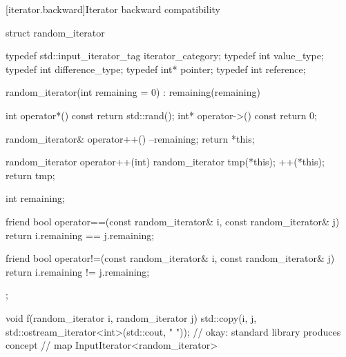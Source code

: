 \documentclass[american,twoside]{book}
\begin{document}
\pnum 
{}

\color{addclr}
[iterator.backward]{Iterator backward compatibility}

\pnum
{}
\begin{codeblock}
struct random_iterator
{
  typedef std::input_iterator_tag iterator_category;
  typedef int                     value_type;
  typedef int                     difference_type;
  typedef int*                    pointer;
  typedef int                     reference;

  random_iterator(int remaining = 0) : remaining(remaining) { }

  int operator*() const { return std::rand(); }
  int* operator->() const { return 0; }
  
  random_iterator& operator++() { --remaining; return *this; }

  random_iterator operator++(int) { 
    random_iterator tmp(*this); ++(*this); return tmp;
  }

  int remaining;

  friend bool 
  operator==(const random_iterator& i, const random_iterator& j)
  {
    return i.remaining == j.remaining;
  }

  friend bool 
  operator!=(const random_iterator& i, const random_iterator& j)
  {
    return i.remaining != j.remaining;
  }
};

void f(random_iterator i, random_iterator j) {
  std::copy(i, j, std::ostream_iterator<int>(std::cout, " ")); // okay: standard library produces concept
                                                               // map InputIterator<random_iterator>
}
\end{codeblock}
\addedConcepts{\exitexample}

\pnum
{}

\pnum
\color{addclr}
\end{document}
